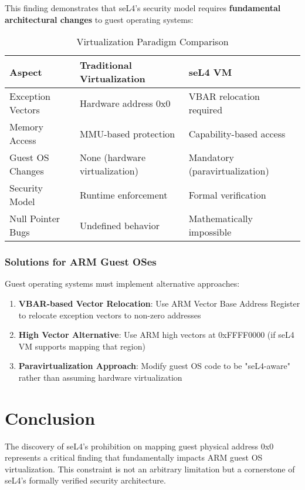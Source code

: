 \documentclass[11pt,a4paper]{article}
\begin{document}
This finding demonstrates that seL4's security model requires \textbf{fundamental architectural changes} to guest operating systems:

\begin{table}[h]
\centering
\begin{tabular}{|l|l|l|}
\hline
\textbf{Aspect} & \textbf{Traditional Virtualization} & \textbf{seL4 VM} \\
\hline
Exception Vectors & Hardware address 0x0 & VBAR relocation required \\
Memory Access & MMU-based protection & Capability-based access \\
Guest OS Changes & None (hardware virtualization) & Mandatory (paravirtualization) \\
Security Model & Runtime enforcement & Formal verification \\
Null Pointer Bugs & Undefined behavior & Mathematically impossible \\
\hline
\end{tabular}
\caption{Virtualization Paradigm Comparison}
\end{table}

\subsubsection{Solutions for ARM Guest OSes}

Guest operating systems must implement alternative approaches:

\begin{enumerate}
    \item \textbf{VBAR-based Vector Relocation}: Use ARM Vector Base Address Register to relocate exception vectors to non-zero addresses
    \item \textbf{High Vector Alternative}: Use ARM high vectors at 0xFFFF0000 (if seL4 VM supports mapping that region)
    \item \textbf{Paravirtualization Approach}: Modify guest OS code to be "seL4-aware" rather than assuming hardware virtualization
\end{enumerate}

\section{Conclusion}

The discovery of seL4's prohibition on mapping guest physical address 0x0 represents a critical finding that fundamentally impacts ARM guest OS virtualization. This constraint is not an arbitrary limitation but a cornerstone of seL4's formally verified security architecture.
\end{document}
